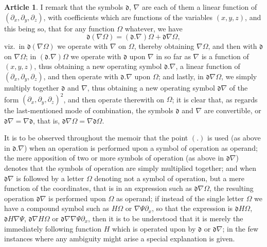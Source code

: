 \documentclass[12pt,a4paper]{article}
\theoremstyle{definition}
\newtheorem{art}{Article}[section]
\begin{document}
\begin{art}
I remark that the symbols $\mathfrak{d}$, $\nabla$ are each of them a linear function of $(\partial_x, \partial_y, \partial_z)$, with coefficients which are functions of the variables $(x, y, z)$, and this being so, that for any function $\Omega$ whatever, we have
\[
\mathfrak{d}(\nabla\Omega) = (\mathfrak{d}.\nabla)\Omega + \mathfrak{d}\nabla\Omega,
\]
viz.\ in $\mathfrak{d}(\nabla\Omega)$ we operate with $\nabla$ on $\Omega$, thereby obtaining $\nabla\Omega$, and then with $\mathfrak{d}$ on $\nabla\Omega$; in $(\mathfrak{d}.\nabla)\Omega$ we operate with $\mathfrak{d}$ upon $\nabla$ in so far as $\nabla$ is a function of $(x, y, z)$, thus obtaining a new operating symbol $\mathfrak{d}.\nabla$, a linear function of $(\partial_x, \partial_y, \partial_z)$, and then operate with $\mathfrak{d}.\nabla$ upon $\Omega$; and lastly, in $\mathfrak{d}\nabla\Omega$, we simply multiply together $\mathfrak{d}$ and $\nabla$, thus obtaining a new operating symbol $\mathfrak{d}\nabla$ of the form $(\partial_x, \partial_y, \partial_z)^2$, and then operate therewith on $\Omega$; it is clear that, as regards the last-mentioned mode of combination, the symbols $\mathfrak{d}$ and $\nabla$ are convertible, or $\mathfrak{d}\nabla = \nabla\mathfrak{d}$, that is, $\mathfrak{d}\nabla\Omega = \nabla\mathfrak{d}\Omega$.

It is to be observed throughout the memoir that the point $(.)$ is used (as above in $\mathfrak{d}.\nabla$) when an operation is performed upon a symbol of operation as operand; the mere apposition of two or more symbols of operation (as above in $\mathfrak{d}\nabla$) denotes that the symbols of operation are simply multiplied together; and when $\mathfrak{d}\nabla$ is followed by a letter $\Omega$ denoting not a symbol of operation, but a mere function of the coordinates, that is in an expression such as $\mathfrak{d}\nabla\Omega$, the resulting operation $\mathfrak{d}\nabla$ is performed upon $\Omega$ as operand; if instead of the single letter $\Omega$ we have a compound symbol such as $H\Omega$ or $\nabla\Psi\partial_x$, so that the expression is $\mathfrak{d}H\Omega$, $\mathfrak{d}H\nabla\Psi$, $\mathfrak{d}\nabla H\Omega$ or $\mathfrak{d}\nabla\nabla\Psi\partial_x$, then it is to be understood that it is merely the immediately following function $H$ which is operated upon by $\mathfrak{d}$ or $\mathfrak{d}\nabla$; in the few instances where any ambiguity might arise a special explanation is given.
\end{art}
\end{document}

